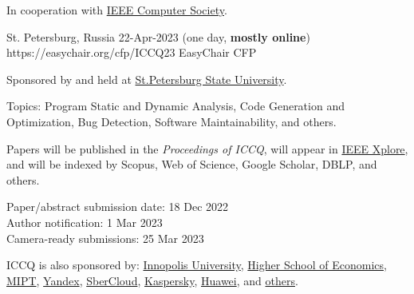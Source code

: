 \documentclass{../cfp}
\begin{document}
\PrintLogo{}



In cooperation
with
\href{https://conferences.ieee.org/conferences_events/conferences/conferencedetails/53703}{IEEE Computer Society}.

\vspace{6pt}

\PrintAddress
  {St. Petersburg, Russia}
  {22-Apr-2023 (one day, \textbf{mostly online})}
  {https://easychair.org/cfp/ICCQ23}
  {EasyChair CFP}

\vspace{12pt}
%
\vspace{12pt}

Sponsored by and held at \href{https://english.spbu.ru}{St.Petersburg State University}.

Topics: Program Static and Dynamic Analysis,
Code Generation and Optimization,
Bug Detection, Software Maintainability, and others.

Papers will be published in the \textit{Proceedings of ICCQ},
will appear in \href{https://ieeexplore.ieee.org/Xplore/home.jsp}{IEEE Xplore\textsuperscript{\textregistered}},
and will be indexed by Scopus, Web of Science, Google Scholar, DBLP, and others.

Paper/abstract submission date: 18 Dec 2022 \\
Author notification: 1 Mar 2023 \\
Camera-ready submissions: 25 Mar 2023

\vspace{6pt}
ICCQ is also sponsored by:
\href{https://innopolis.university/}{Innopolis University},
\href{https://www.hse.ru/en/}{Higher School of Economics},
\href{https://mipt.ru/english/}{MIPT},
\href{https://yandex.com/company/}{Yandex},
\href{https://sbercloud.ru/}{SberCloud},
\href{https://www.kaspersky.com/}{Kaspersky},
\href{https://www.huawei.com/}{Huawei},
and \href{https://www.iccq.ru/2022.html#partners}{others}.
\end{document}
